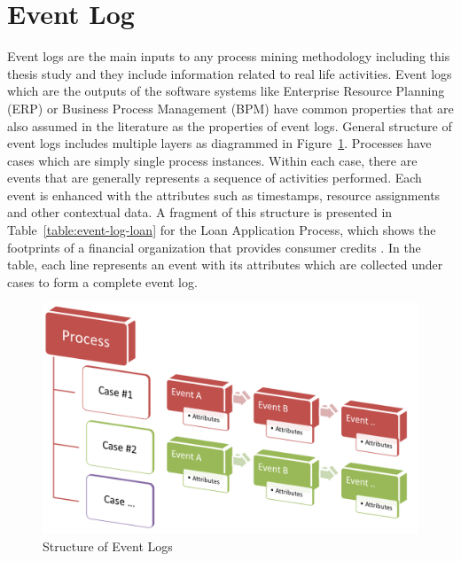 \section{Event Log}
\label{sec:event-log}
Event logs are the main inputs to any process mining methodology including this thesis study and they include information related to real life activities. Event logs which are the outputs of the software systems like Enterprise Resource Planning (ERP) or Business Process Management (BPM) have common properties that are also assumed in the literature as the properties of event logs. General structure of event logs includes multiple layers as diagrammed in Figure~\ref{fig:event-log-structure}. Processes have cases which are simply single process instances. Within each case, there are events that are generally represents a sequence of activities performed. Each event is enhanced with the attributes such as timestamps, resource assignments and other contextual data. A fragment of this structure is presented in Table~\ref{table:event-log-loan} for the Loan Application Process\cite{loan-app-data}, which shows the footprints of a financial organization that provides consumer credits \cite{buijs2013improving}. In the table, each line represents an event with its attributes which are collected under cases to form a complete event log. 
\begin{figure}
  \centering
  \includegraphics[width=\textwidth]{3_background/event_log_structure}
  \caption{Structure of Event Logs}
  \label{fig:event-log-structure}
\end{figure}

